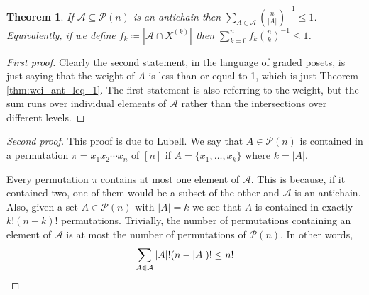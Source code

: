 \documentclass{report}
\theoremstyle{definition}
\theoremstyle{plain}
\newtheorem{thm}{Theorem}[section]
\theoremstyle{definition}
\begin{document}
 	\begin{thm}
 		If $\mathcal{A}\subseteq \mathcal{P}(n)$ is an antichain then $\sum_{A\in\mathcal{A}}\binom{n}{|A|}^{-1} \leq 1$. Equivalently, if we define $f_k\coloneqq |\mathcal{A}\cap X^{(k)}|$ then $\sum_{k=0}^{n} f_k\binom{n}{k}^{-1}\leq 1$.
 	\end{thm}
 	\begin{proof}[First proof]
 		Clearly the second statement, in the language of graded posets, is just saying that the weight of $A$ is less than or equal to 1, which is just Theorem \ref{thm:wei_ant_leq_1}. The first statement is also referring to the weight, but the sum runs over individual elements of $\mathcal{A}$ rather than the intersections over different levels.
 	\end{proof}
 	\begin{proof}[Second proof]
 		This proof is due to Lubell. We say that $A\in\mathcal{P}(n)$ is contained in a permutation $\pi = x_1x_2\cdots x_n$ of $[n]$ if $A= \{x_1,\ldots,x_k\}$ where $k = |A|$.
 		
 		Every permutation $\pi$ contains at most one element of $\mathcal{A}$. This is because, if it contained two, one of them would be a subset of the other and $\mathcal{A}$ is an antichain. Also, given a set $A\in\mathcal{P}(n)$ with $|A| =k$ we see that $A$ is contained in exactly $k!(n-k)!$ permutations. Trivially, the number of permutations containing an element of $\mathcal{A}$ is at most the number of permutations of $\mathcal{P}(n)$. In other words,
 		\[
 			\sum_{A\in\mathcal{A}}|A|! (n-|A|)! \leq n!\qedhere
 		\]
 	\end{proof}
\end{document}
